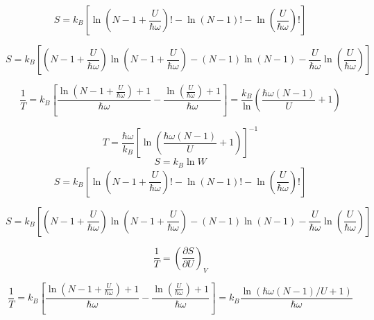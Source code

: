\begin{equation}
S = k_B \left[ \ln \left( N - 1 + \frac{U}{\hbar\omega} \right)! - \ln (N - 1)! - \ln \left( \frac{U}{\hbar\omega} \right)! \right]
\end{equation}

\begin{equation*}
S = k_B \left[ \left( N - 1 + \frac{U}{\hbar\omega} \right) \ln \left( N - 1 + \frac{U}{\hbar\omega} \right) - (N - 1) \ln (N - 1) - \frac{U}{\hbar\omega} \ln \left( \frac{U}{\hbar\omega} \right) \right]
\end{equation*}

\begin{equation}
\frac{1}{T} = k_B \left[ \frac{\ln \left( N - 1 + \frac{U}{\hbar\omega} \right) + 1}{\hbar\omega} - \frac{\ln \left( \frac{U}{\hbar\omega} \right) + 1}{\hbar\omega} \right] = \frac{k_B}\ln{\left(\frac{\hbar\omega(N-1)}{U}+1 \right)}
\end{equation}


\begin{equation}
T = \frac{\hbar\omega}{k_B} \left[ \ln \left(\frac{\hbar\omega(N - 1)}{U} + 1 \right) \right]^{-1}
\end{equation}
\begin{equation}
S = k_B \ln W
\end{equation}
\begin{equation}
S = k_B \left[ \ln \left( N - 1 + \frac{U}{\hbar\omega} \right)! - \ln (N - 1)! - \ln \left( \frac{U}{\hbar\omega} \right)! \right]
\end{equation}

\begin{equation*}
S = k_B \left[ \left( N - 1 + \frac{U}{\hbar\omega} \right) \ln \left( N - 1 + \frac{U}{\hbar\omega} \right) - (N - 1) \ln (N - 1) - \frac{U}{\hbar\omega} \ln \left( \frac{U}{\hbar\omega} \right) \right]
\end{equation*}

\begin{equation}
\frac{1}{T} = \left( \frac{\partial S}{\partial U} \right)_V
\end{equation}

\begin{equation*}
\frac{1}{T} = k_B \left[ \frac{\ln \left( N - 1 + \frac{U}{\hbar\omega} \right) + 1}{\hbar\omega} - \frac{\ln \left( \frac{U}{\hbar\omega} \right) + 1}{\hbar\omega} \right] = k_B \frac{\ln \left( \hbar\omega(N - 1)/U + 1 \right)}{\hbar\omega}
\end{equation*}

